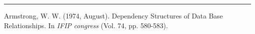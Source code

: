 \documentclass{article}
\begin{document}
 






\hspace{-0.5cm}\rule[-0.101in]{\textwidth}{0.0025in}
  
   
 
 
  
  
  
\begin{thebibliography}{99}
 Armstrong, W. W. (1974, August). Dependency Structures of Data Base Relationships. In \textit{IFIP congress} (Vol. 74, pp. 580-583).

\end{thebibliography}




 
\end{document}

